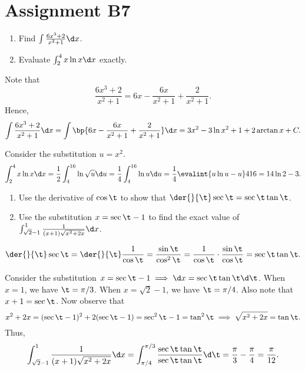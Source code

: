 \section{Assignment B7}

\begin{problem}
    \begin{enumerate}
        \item Find $\int \frac{6x^3 + 2}{x^2 + 1} \d x$.
        \item Evaluate $\int_2^4 x\ln x \d x$ exactly.
    \end{enumerate}
\end{problem}
\begin{solution}
    \begin{ppart}
        Note that \[\frac{6x^3 + 2}{x^2 + 1} = 6x - \frac{6x}{x^2 + 1} + \frac{2}{x^2 + 1}.\] Hence,  \[\int \frac{6x^3 + 2}{x^2 + 1} \d x = \int \bp{6x - \frac{6x}{x^2 + 1} + \frac{2}{x^2 + 1}} \d x = 3x^2 - 3\ln{x^2 + 1} + 2 \arctan x + C.\]
    \end{ppart}
    \begin{ppart}
        Consider the substitution $u = x^2$. \[\int_2^4 x \ln x \d x = \frac12 \int_4^{16} \ln \sqrt{u} \d u = \frac14 \int_4^{16} \ln u \d u = \frac14 \evalint{u\ln u - u}4{16} = 14\ln 2 - 3.\]
    \end{ppart}
\end{solution}

\begin{problem}
    \begin{enumerate}
        \item Use the derivative of $\cos \t$ to show that $\der{}{\t} \sec \t = \sec \t \tan \t$.
        \item Use the substitution $x = \sec \t - 1$ to find the exact value of $\int_{\sqrt2 - 1}^1 \frac1{(x+1)\sqrt{x^2 + 2x}} \d x$.
    \end{enumerate}
\end{problem}
\begin{solution}
    \begin{ppart}
        \[\der{}{\t} \sec \t = \der{}{\t} \frac1{\cos \t} = \frac{\sin \t}{\cos^2 \t} = \frac{1}{\cos \t} \cdot \frac{\sin \t}{\cos \t} = \sec \t \tan \t.\]
    \end{ppart}
    \begin{ppart}
        Consider the substitution $x = \sec \t - 1 \implies \d x = \sec\t\tan\t \d \t$. When $x = 1$, we have $\t = \pi/3$. When $x = \sqrt2 - 1$, we have $\t = \pi/4$. Also note that $x + 1 = \sec\t$. Now observe that \[x^2 + 2x = (\sec \t - 1)^2 + 2(\sec \t - 1) = \sec^2\t - 1 = \tan^2\t \implies \sqrt{x^2 + 2x} = \tan\t.\] Thus, \[\int_{\sqrt2 - 1}^1 \frac1{(x+1)\sqrt{x^2 + 2x}} \d x = \int_{\pi/4}^{\pi/3} \frac{\sec\t\tan\t}{\sec\t\tan\t} \d\t = \frac\pi3 - \frac\pi4 = \frac\pi{12}.\]
    \end{ppart}
\end{solution}

